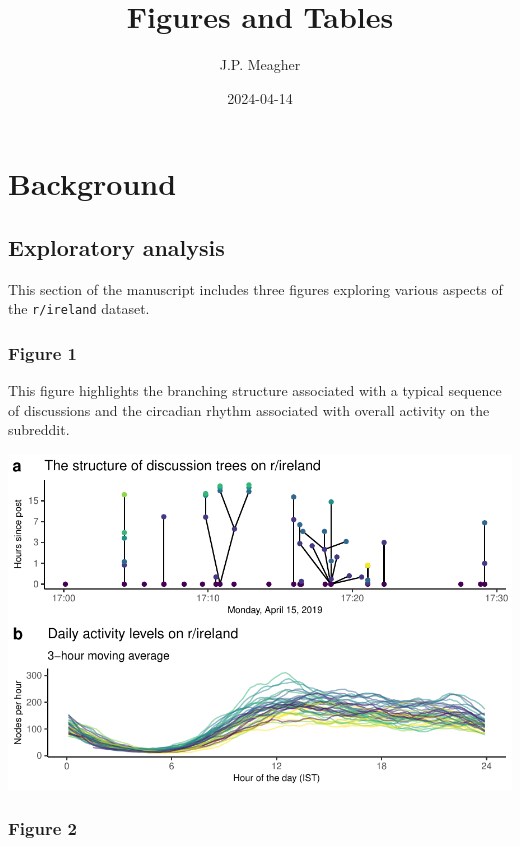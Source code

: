 \documentclass[
]{article}
\title{Figures and Tables}
\author{J.P. Meagher}
\date{2024-04-14}
\begin{document}
\maketitle

\hypertarget{background}{%
\section{Background}\label{background}}

\hypertarget{exploratory-analysis}{%
\subsection{Exploratory analysis}\label{exploratory-analysis}}

This section of the manuscript includes three figures exploring various
aspects of the \texttt{r/ireland} dataset.

\hypertarget{figure-1}{%
\subsubsection{Figure 1}\label{figure-1}}

This figure highlights the branching structure associated with a typical
sequence of discussions and the circadian rhythm associated with overall
activity on the subreddit.

\includegraphics{figures_and_tables_files/figure-latex/data_exploration-1.pdf}

\hypertarget{figure-2}{%
\subsubsection{Figure 2}\label{figure-2}}
\end{document}
